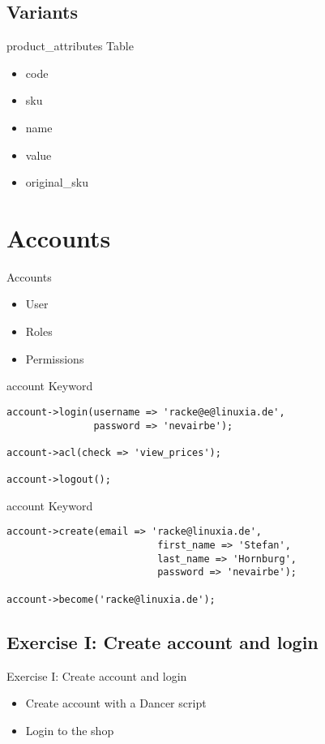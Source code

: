 \subsection{Variants}
\begin{frame}[fragile]{product\_attributes Table}
\begin{itemize}
\item code
\item sku
\item name
\item value
\item original\_sku
\end{itemize}
\end{frame}

\section{Accounts}
\begin{frame}{Accounts}
\begin{itemize}
\item User
\item Roles
\item Permissions
\end{itemize}
\end{frame}

\begin{frame}[fragile]{account Keyword}
\begin{lstlisting}
account->login(username => 'racke@e@linuxia.de',
               password => 'nevairbe');

account->acl(check => 'view_prices');

account->logout();
\end{lstlisting}
\end{frame}

\begin{frame}[fragile]{account Keyword}
\begin{lstlisting}
account->create(email => 'racke@linuxia.de',
                          first_name => 'Stefan',
                          last_name => 'Hornburg',
                          password => 'nevairbe');

account->become('racke@linuxia.de');
\end{lstlisting}
\end{frame}

\subsection{Exercise I: Create account and login}
\begin{frame}{Exercise I: Create account and login}
\begin{itemize}
\item Create account with a Dancer script
\item Login to the shop
\end{itemize}
\end{frame}

